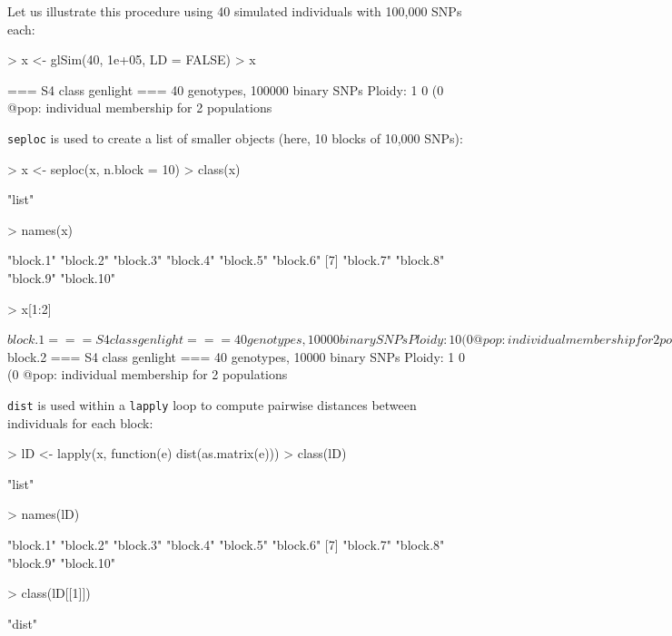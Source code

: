 \documentclass{article}
\begin{document}
Let us illustrate this procedure using 40 simulated individuals with 100,000 SNPs each:
\begin{Schunk}
\begin{Sinput}
> x <- glSim(40, 1e+05, LD = FALSE)
> x
\end{Sinput}
\begin{Soutput}
 === S4 class genlight ===
 40 genotypes,  100000 binary SNPs
 Ploidy: 1
 0 (0 %
 @pop: individual membership for 2 populations
\end{Soutput}
\end{Schunk}
\texttt{seploc} is used to create a list of smaller objects (here, 10 blocks of 10,000 SNPs):
\begin{Schunk}
\begin{Sinput}
> x <- seploc(x, n.block = 10)
> class(x)
\end{Sinput}
\begin{Soutput}
[1] "list"
\end{Soutput}
\begin{Sinput}
> names(x)
\end{Sinput}
\begin{Soutput}
 [1] "block.1"  "block.2"  "block.3"  "block.4"  "block.5"  "block.6" 
 [7] "block.7"  "block.8"  "block.9"  "block.10"
\end{Soutput}
\begin{Sinput}
> x[1:2]
\end{Sinput}
\begin{Soutput}
$block.1
 === S4 class genlight ===
 40 genotypes,  10000 binary SNPs
 Ploidy: 1
 0 (0 %
 @pop: individual membership for 2 populations

$block.2
 === S4 class genlight ===
 40 genotypes,  10000 binary SNPs
 Ploidy: 1
 0 (0 %
 @pop: individual membership for 2 populations
\end{Soutput}
\end{Schunk}
\texttt{dist} is used within a \texttt{lapply} loop to compute pairwise distances between
individuals for each block:
\begin{Schunk}
\begin{Sinput}
> lD <- lapply(x, function(e) dist(as.matrix(e)))
> class(lD)
\end{Sinput}
\begin{Soutput}
[1] "list"
\end{Soutput}
\begin{Sinput}
> names(lD)
\end{Sinput}
\begin{Soutput}
 [1] "block.1"  "block.2"  "block.3"  "block.4"  "block.5"  "block.6" 
 [7] "block.7"  "block.8"  "block.9"  "block.10"
\end{Soutput}
\begin{Sinput}
> class(lD[[1]])
\end{Sinput}
\begin{Soutput}
[1] "dist"
\end{Soutput}
\end{Schunk}
\end{document}
